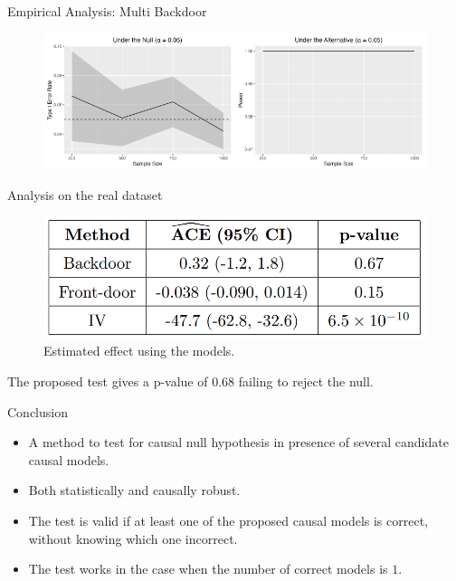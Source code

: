 \documentclass{beamer}
\begin{document}
\begin{frame}{Empirical Analysis: Multi Backdoor}
	\begin{figure}
		\center
		\includegraphics[scale=0.45]{multi_back.png}
	\end{figure}
\end{frame}

\begin{frame}{Analysis on the real dataset}
	\begin{figure}
		\center
		\includegraphics[scale=0.2]{table.png}
		\caption*{Estimated effect using the models.}
	\end{figure}

	\vspace{2em}
	\center
	The proposed test gives a p-value of $ 0.68 $ failing to reject the null.
\end{frame}

\begin{frame}{Conclusion}
	\begin{itemize}
		\item A method to test for causal null hypothesis in presence of several candidate causal models.
		\item Both statistically and causally robust.
		\item The test is valid if at least one of the proposed causal models is correct, without knowing which one incorrect.
		\item The test works in the case when the number of correct models is $1$.
	\end{itemize}
\end{frame}
\end{document}
